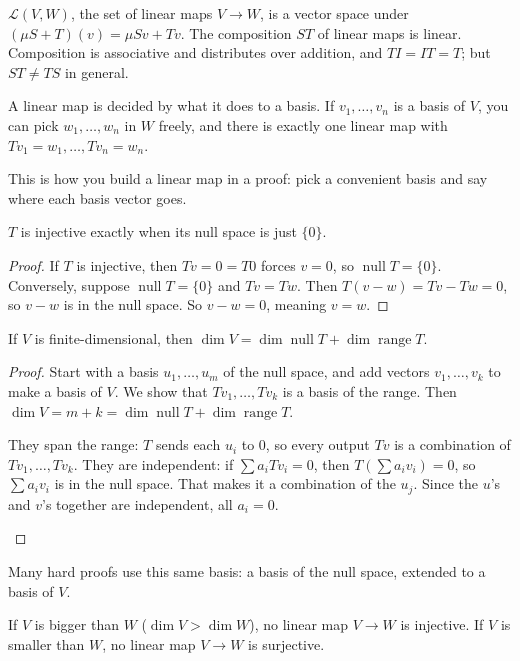 \documentclass[11pt]{scrartcl}
\DeclareMathOperator{\nul}{null}
\DeclareMathOperator{\range}{range}
\newcommand{\LL}{\mathcal L}
\begin{document}
\begin{proposition*}
  $\LL(V,W)$, the set of linear maps $V\to W$, is a vector space under $(\mu S+T)(v)=\mu Sv+Tv$.
  The composition $ST$ of linear maps is linear. Composition is associative and distributes over addition, and $TI=IT=T$; but $ST\ne TS$ in general.
\end{proposition*}

\begin{proposition*}[LADR 3.4]
  A linear map is decided by what it does to a basis.
  If $v_1,\dots,v_n$ is a basis of $V$, you can pick $w_1,\dots,w_n$ in $W$ freely, and there is exactly one linear map with $Tv_1=w_1,\dots,Tv_n=w_n$.
\end{proposition*}
This is how you build a linear map in a proof: pick a convenient basis and say where each basis vector goes.

\begin{proposition*}[LADR 3.15]
  $T$ is injective exactly when its null space is just $\{0\}$.
\end{proposition*}
\begin{proof}
  If $T$ is injective, then $Tv=0=T0$ forces $v=0$, so $\nul T=\{0\}$. Conversely, suppose $\nul T=\{0\}$ and $Tv=Tw$. Then $T(v-w)=Tv-Tw=0$, so $v-w$ is in the null space. So $v-w=0$, meaning $v=w$.
\end{proof}

\begin{theorem*}
  If $V$ is finite-dimensional, then $\dim V=\dim\nul T+\dim\range T$.
\end{theorem*}
\begin{proof}
  Start with a basis $u_1,\dots,u_m$ of the null space, and add vectors $v_1,\dots,v_k$ to make a basis of $V$.
  We show that $Tv_1,\dots,Tv_k$ is a basis of the range. Then $\dim V=m+k=\dim\nul T+\dim\range T$.
  \begin{itemize}
    \ii They span the range: $T$ sends each $u_i$ to $0$, so every output $Tv$ is a combination of $Tv_1,\dots,Tv_k$.
    \ii They are independent: if $\sum a_iTv_i=0$, then $T(\sum a_iv_i)=0$, so $\sum a_iv_i$ is in the null space. That makes it a combination of the $u_j$. Since the $u$'s and $v$'s together are independent, all $a_i=0$.
  \end{itemize}
\end{proof}
Many hard proofs use this same basis: a basis of the null space, extended to a basis of $V$.

\begin{corollary*}
  If $V$ is bigger than $W$ ($\dim V>\dim W$), no linear map $V\to W$ is injective.
  If $V$ is smaller than $W$, no linear map $V\to W$ is surjective.
\end{corollary*}
\end{document}

